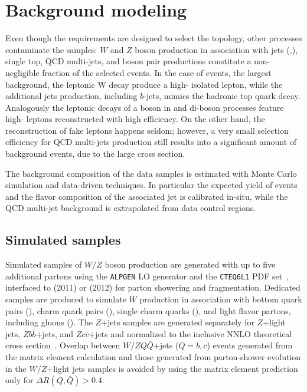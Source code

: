 \section{Background modeling}
\label{sec:bckgmodel}

Even though the requirements are designed to select the \ttbar{}
topology, other processes contaminate the samples: $W$ and $Z$ boson
production in association with jets (\wjets{},\zjets{}), single top,
QCD multi-jets, and boson pair productions constitute a non-negligible
fraction of the selected events.
In the case of \wjets{} events, the largest background, the leptonic W
decay produce a high-\pt{} isolated lepton, while the additional jets
production, including $b$-jets, mimics the hadronic top quark decay.
Analogously the leptonic decays of a boson in \zjets{} and di-boson
processes feature high-\pt{} leptons reconstructed with high
efficiency.
On the other hand, the reconstruction of fake leptons happens seldom;
however, a very small selection efficiency for QCD multi-jets
production still results into a significant amount of background
events, due to the large cross section.

The background composition of the data samples is estimated with Monte
Carlo simulation and data-driven techniques. In particular the
expected yield of \wjets{} events and the flavor composition of the
associated jet is calibrated in-situ, while the QCD
multi-jet background is extrapolated from data control regions.

\subsection{Simulated samples}
\label{sec:mcsamples}

Simulated samples of $W/Z$ boson production are generated with up to
five additional partons using the {\tt ALPGEN} LO generator and the
{\tt CTEQ6L1} PDF set~\cite{cteq6}, interfaced to \herwig{} (2011) or
\pythia{} (2012) for parton showering and fragmentation. 
Dedicated samples are produced to simulate $W$ production in
association with bottom quark pairs (\wbb{}), charm quark
pairs (\wcc{}), single charm quarks (\wc{}), and light
flavor partons, including gluons (\wlight{}).
The $Z$+jets samples are generated separately for $Z$+light jets,
$Zb\bar{b}$+jets, and $Zc\bar{c}$+jets and normalized to the inclusive
NNLO theoretical cross section~\cite{vjetsxs}.
Overlap between $W/ZQ\bar{Q}$+jets ($Q=b,c$) events generated from the
matrix element calculation and those generated from parton-shower
evolution in the $W/Z$+light jets samples is avoided by using the
matrix element prediction only for $\Delta R(Q,\bar{Q})>0.4$.

